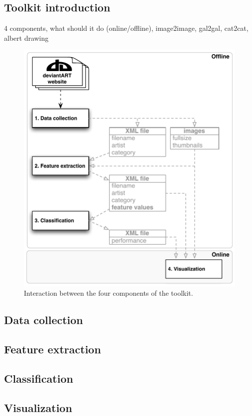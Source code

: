 \subsection{Toolkit introduction}
4 components, what should it do (online/offline), image2image, gal2gal, cat2cat, albert drawing

\begin{figure}[htb]
  \centering
  \includegraphics[width=1\linewidth]{img/components.pdf}
  \caption{Interaction between the four components of the toolkit.}
  \label{fig:components}
\end{figure}

\subsection{Data collection}
\subsection{Feature extraction}
\subsection{Classification}
\subsection{Visualization}

